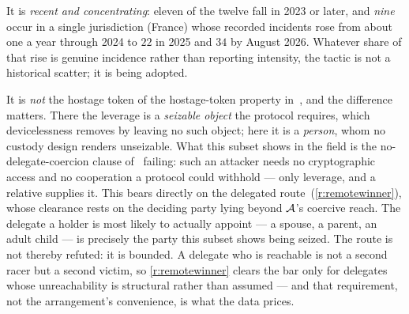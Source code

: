 It is \emph{recent and concentrating}: eleven of the twelve fall in 2023 or later, and \emph{nine}
occur in a single jurisdiction (France) whose recorded incidents rose from about one a year through
2024 to $22$ in 2025 and $34$ by August 2026. Whatever share of that rise is genuine incidence
rather than reporting intensity, the tactic is not a historical scatter; it is being adopted.

It is \emph{not} the hostage token of the hostage-token property in~\cite{deadly-race}, and the difference matters. There the
leverage is a \emph{seizable object} the protocol requires, which devicelessness removes by leaving
no such object; here it is a \emph{person}, whom no custody design renders unseizable. What this
subset shows in the field is the no-delegate-coercion clause of~\cite{deadly-race} failing:
such an attacker needs no
cryptographic access and no cooperation a protocol could withhold --- only leverage, and a
relative supplies it. This bears directly on the delegated route~(\ref{r:remotewinner}), whose
clearance rests on the deciding party lying beyond $\mathcal{A}$'s coercive reach. The delegate a
holder is most likely to actually appoint --- a spouse, a parent, an adult child --- is precisely
the party this subset shows being seized. The route is not thereby refuted: it is bounded. A
delegate who is reachable is not a second racer but a second victim, so \ref{r:remotewinner}
clears the bar only for delegates whose unreachability is structural rather than assumed --- and
that requirement, not the arrangement's convenience, is what the data prices.

